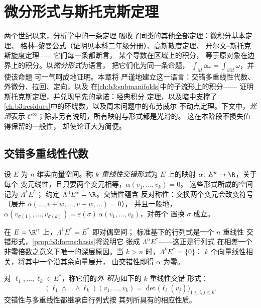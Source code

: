 \chapter{微分形式与斯托克斯定理}\label{ch:b3:forms}

两个世纪以来，分析学中的一条定理
吸收了同类的其他全部定理：微积分基本定理、
格林–黎曼公式（证明见本科二年级分册）、高斯散度定理、
开尔文–斯托克斯旋度定理——它们每一条都断言，
某个导数在区域上的积分，
等于原对象在边界上的积分。以\emph{微分形式}为语言，
把它们化为同一条命题，
$\int_M\dd\omega = \int_{\partial M}\omega$，并使该命题
可一气呵成地证明。本章将
严谨地建立这一语言：交错多重线性代数、
外微分、拉回、定向，以及
在\cref{ch:b3:submanifolds}中的子流形上的积分——
证明斯托克斯定理，并兑现早先的承诺：经典积分
定理，以及暗中支撑了
\cref{ch:b3:residues}中的环绕数，以及周末问题中的布劳威尔
不动点定理。下文中，\emph{光滑}表示 $\mathcal
C^\infty$；除非另有说明，所有映射与形式都是光滑的。
这在本阶段不损失值得保留的一般性，
却使论证大为简便。

\section{交错多重线性代数}

\begin{definition}\label{def:b3:forms:alternating}
设 $E$ 为 $n$ 维实向量空间。称
\emph{$k$ 重线性交错形式}为
$E$ 上的映射 $\alpha\colon E^k \to \R$，关于每个
变元线性，且只要两个变元相等，$\alpha(v_1, \dots, v_k) = 0$。
这些形式所成的空间记为 $\Lambda^k E^*$；
约定 $\Lambda^0E^* = \R$。交错性蕴含
反对称性：交换两个变元会改变符号
（展开 $\alpha(\dots, v + w, \dots, v + w, \dots) = 0$），
并且一般地，$\alpha(v_{\sigma(1)}, \dots, v_{\sigma(k)}) =
\varepsilon(\sigma)\,\alpha(v_1, \dots, v_k)$，对每个
置换 $\sigma$ 成立。
\end{definition}

\begin{example}
在 $E = \R^n$ 上，$\Lambda^1E^* = E^*$ 即对偶空间；
标准基下的行列式是一个 $n$ 重线性
交错形式，\cref{prop:b3:forms:basis}将说明它
张成 $\Lambda^nE^*$——这正是行列式
在相差一个非零倍数之意义下唯一的深层原因。当 $k > n$ 时，$\Lambda^kE^* = \{0\}$：
$k$ 个向量线性相关，将其中一个沿其余向量展开，
由交错性即得 $\alpha$ 为零。
\end{example}

\begin{definition}\label{def:b3:forms:wedge}
对 $\ell_1, \dots, \ell_k \in E^*$，称它们的\emph{外
积}为如下的 $k$ 重线性交错
形式：
\[
(\ell_1 \wedge \dots \wedge \ell_k)(v_1, \dots, v_k)
= \det\bigl(\ell_i(v_j)\bigr)_{1 \leq i, j \leq k} .
\]
交错性与多重线性都继承自行列式按
其列所具有的相应性质。
\end{definition}

